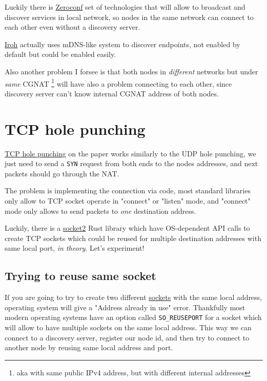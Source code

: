 \documentclass[a4paper]{article}
\begin{document}
Luckily there is \href{https://en.wikipedia.org/wiki/Zero-configuration_networking}{Zeroconf}
set of technologies that will allow to broadcast and discover services in local network,
so nodes in the same network can connect to each other even without a discovery server.

\href{https://docs.iroh.computer/connecting/local-discovery}{Iroh}
actually uses mDNS-like system to discover endpoints, not enabled by default
but could be enabled easily.

Also another problem I forsee is that both nodes in \emph{different} networks but under \emph{same} CGNAT
\footnote{aka with same public IPv4 address, but with different internal addresses}
will have also a problem connecting to each other, since discovery server
can't know internal CGNAT address of both nodes.

\section{TCP hole punching}

\href{https://en.wikipedia.org/wiki/TCP_hole_punching}{TCP hole punching} on the paper works
similarly to the UDP hole punching, we just need to send a \texttt{SYN} request from both ends
to the nodes addresses, and next packets should go through the NAT.

The problem is implementing the connection via code, most standard libraries only allow
to TCP socket operate in "connect" or "listen" mode, and "connect" mode only allows to
send packets to \emph{one} destination address.

Luckily, there is a \href{https://crates.io/crates/socket2}{socket2} Rust library
which have OS-dependent API calls to create TCP sockets which could be reused for multiple
destination addresses with same local port, \emph{in theory}. Let's experiment!

\subsection{Trying to reuse same socket}
If you are going to try to create two different \href{https://en.wikipedia.org/wiki/Network_socket}{sockets}
with the same local address, operating system will give a "Address already in use" error.
Thankfully most modern operating systems have an option called \texttt{SO\_REUSEPORT} for a socket
which will allow to have multiple sockets on the same local address. This way we can connect
to a discovery server, register our node id, and then try to connect to another node by reusing
same local address and port.
\end{document}
